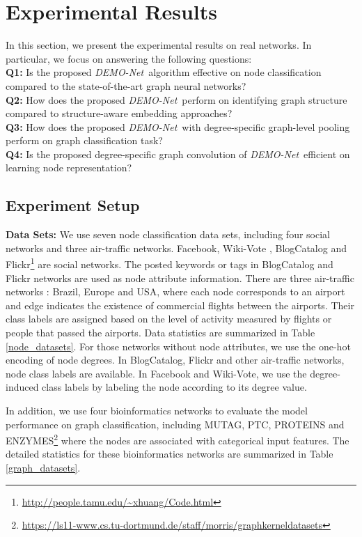\documentclass[sigconf]{acmart}
\newcommand{\demonet}{{\emph {DEMO-Net}}}
\begin{document}
\section{Experimental Results}
In this section, we present the experimental results on real networks. In particular, we  focus on answering the following questions: \\
\textbf{Q1:} Is the proposed \demonet\ algorithm effective on node classification compared to the state-of-the-art graph neural networks? \\
\textbf{Q2:} How does the proposed \demonet\ perform on identifying graph structure compared to structure-aware embedding approaches?\\
\textbf{Q3:} How does the proposed \demonet\ with degree-specific graph-level pooling perform on graph classification task? \\
\textbf{Q4:} Is the proposed degree-specific graph convolution of \demonet\ efficient on learning node representation?

\subsection{Experiment Setup}
\textbf{Data Sets:} We use seven node classification data sets, including four social networks and three air-traffic networks. Facebook, Wiki-Vote \cite{snapnets},
BlogCatalog and Flickr\footnote{\url{http://people.tamu.edu/~xhuang/Code.html}} are social networks.
The posted keywords or tags in BlogCatalog and Flickr networks are used as node attribute information. There are three air-traffic networks \cite{ribeiro2017struc2vec}: Brazil, Europe and USA, where each node corresponds to an airport and edge indicates the existence of commercial flights between the airports. Their class labels are assigned based on the level of activity measured by flights or people that passed the airports. Data statistics are summarized in Table \ref{node_datasets}.
For those networks without node attributes, we use the one-hot encoding of node degrees. In BlogCatalog, Flickr and other air-traffic networks, node class labels are available. In Facebook and Wiki-Vote, we use the degree-induced class labels by labeling the node according to its degree value.

In addition, we use four bioinformatics networks to evaluate the model performance on graph classification, including MUTAG, PTC, PROTEINS and ENZYMES\footnote{\url{https://ls11-www.cs.tu-dortmund.de/staff/morris/graphkerneldatasets}} where the nodes are associated with categorical input features. The detailed statistics for these bioinformatics networks are summarized in Table \ref{graph_datasets}.
\end{document}
